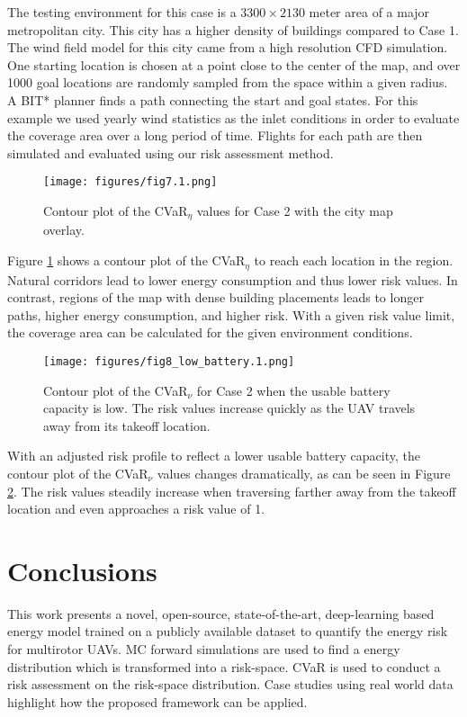 \documentclass[letterpaper, 10 pt, conference]{ieeeconf}
\begin{document}
The testing environment for this case is a $3300 \times 2130$ meter area of a major metropolitan city. This city has a higher density of buildings compared to Case 1. The wind field model for this city came from a high resolution CFD simulation. One starting location is chosen at a point close to the center of the map, and over 1000 goal locations are randomly sampled from the space within a given radius. A BIT* planner \cite{Gammell_2015} finds a path connecting the start and goal states. For this example we used yearly wind statistics as the inlet conditions in order to evaluate the coverage area over a long period of time. Flights for each path are then simulated and evaluated using our risk assessment method.  


\begin{figure}
    \centering
      \texttt{[image: figures/fig7.1.png]}
    \caption{Contour plot of the CVaR$_\eta$ values for Case 2 with the city map overlay.}
    \label{fig:study2}
\end{figure}

Figure \ref{fig:study2} shows a contour plot of the CVaR$_\eta$ to reach each location in the region. Natural corridors lead to lower energy consumption and thus lower risk values. In contrast, regions of the map with dense building placements leads to longer paths, higher energy consumption, and higher risk.
With a given risk value limit, the coverage area can be calculated for the given environment conditions.
\begin{figure}
    \centering
      \texttt{[image: figures/fig8\_low\_battery.1.png]}
    \caption{Contour plot of the CVaR$_\nu$ for Case 2 when the usable battery capacity is low. The risk values increase quickly as the UAV travels away from its takeoff location.}
    \label{fig:study2bat}
\end{figure}

With an adjusted risk profile to reflect a lower usable battery capacity, the contour plot of the CVaR$_\nu$ values changes dramatically, as can be seen in Figure \ref{fig:study2bat}. The risk values steadily increase when traversing farther away from the takeoff location and even approaches a risk value of 1.




\section{Conclusions}
\label{sec:conclusion}
This work presents a novel, open-source, state-of-the-art, deep-learning based energy model trained on a publicly available dataset to quantify the energy risk for multirotor UAVs. MC forward simulations are used to find a energy distribution which is transformed into a risk-space. CVaR is used to conduct a risk assessment on the risk-space distribution. Case studies using real world data highlight how the proposed framework can be applied. 
\end{document}
